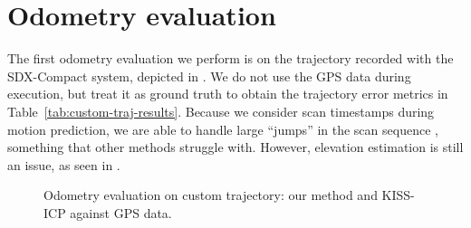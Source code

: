 \section{Odometry evaluation}

The first odometry evaluation we perform is on the trajectory recorded with the \mbox{SDX-Compact} system, depicted in . We do not use the GPS data during execution, but treat it as ground truth to obtain the trajectory error metrics in Table~\ref{tab:custom-traj-results}. Because we consider scan timestamps during motion prediction, we are able to handle large ``jumps'' in the scan sequence , something that other methods struggle with. However, elevation estimation is still an issue, as seen in .

\begin{figure}[h]
    \centering
    \hspace{1pt}
    \caption[Odometry evaluation on custom trajectory]{Odometry evaluation on custom trajectory: our method and KISS-ICP \cite{vizzo2023ral} against GPS data.}
    \label{fig:odom-traj}
\end{figure}

